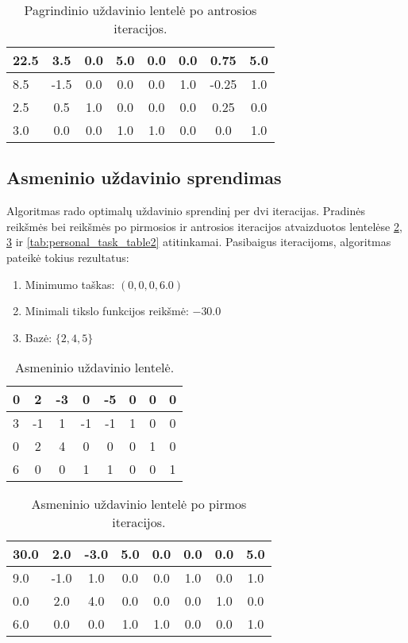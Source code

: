 \documentclass[a4paper,12pt,fleqn]{article}
\begin{document}
\begin{table}[h!]
\centering
\caption{Pagrindinio uždavinio lentelė po antrosios iteracijos.}
\label{tab:generic_task_table2}
\begin{tabular}{@{}lccccccc@{}}
\toprule
22.5 & 3.5 & 0.0 & 5.0 & 0.0 & 0.0 & 0.75 & 5.0 \\ \midrule
8.5 & -1.5 & 0.0 & 0.0 & 0.0 & 1.0 & -0.25 & 1.0 \\
2.5 & 0.5 & 1.0 & 0.0 & 0.0 & 0.0 & 0.25 & 0.0 \\
3.0 & 0.0 & 0.0 & 1.0 & 1.0 & 0.0 & 0.0 & 1.0 \\ \bottomrule
\end{tabular}
\end{table}

\pagebreak
\subsection{Asmeninio uždavinio sprendimas}

Algoritmas rado optimalų uždavinio sprendinį per dvi iteracijas. Pradinės reikšmės bei reikšmės po pirmosios ir antrosios iteracijos atvaizduotos lentelėse \ref{tab:personal_task_table}, \ref{tab:personal_task_table1} ir \ref{tab:personal_task_table2} atitinkamai. Pasibaigus iteracijoms, algoritmas pateikė tokius rezultatus:

\begin{enumerate}
    \item Minimumo taškas: $\left(0, 0, 0, 6.0\right)$
    \item Minimali tikslo funkcijos reikšmė: $-30.0$
    \item Bazė: $\{2, 4, 5\}$
\end{enumerate}

\begin{table}[h!]
\centering
\caption{Asmeninio uždavinio lentelė.}
\label{tab:personal_task_table}
\begin{tabular}{@{}lccccccc@{}}
\toprule
0 & 2 & -3 & 0 & -5 & 0 & 0 & 0 \\ \midrule
3 & -1 & 1 & -1 & -1 & 1 & 0 & 0 \\
0 & 2 & 4 & 0 & 0 & 0 & 1 & 0 \\
6 & 0 & 0 & 1 & 1 & 0 & 0 & 1 \\ \bottomrule
\end{tabular}
\end{table}

\begin{table}[h!]
\centering
\caption{Asmeninio uždavinio lentelė po pirmos iteracijos.}
\label{tab:personal_task_table1}
\begin{tabular}{@{}lccccccc@{}}
\toprule
30.0 & 2.0 & -3.0 & 5.0 & 0.0 & 0.0 & 0.0 & 5.0 \\ \midrule
9.0 & -1.0 & 1.0 & 0.0 & 0.0 & 1.0 & 0.0 & 1.0 \\
0.0 & 2.0 & 4.0 & 0.0 & 0.0 & 0.0 & 1.0 & 0.0 \\
6.0 & 0.0 & 0.0 & 1.0 & 1.0 & 0.0 & 0.0 & 1.0 \\ \bottomrule
\end{tabular}
\end{table}
\end{document}
